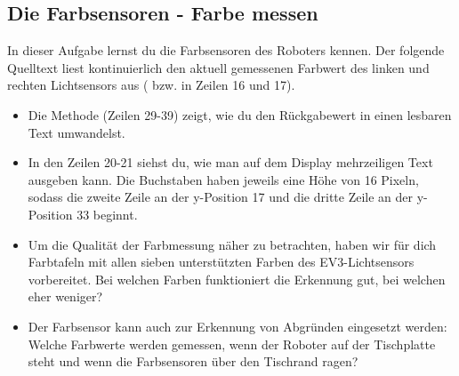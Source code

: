 \subsection{Die Farbsensoren - Farbe messen}
	In dieser Aufgabe lernst du die Farbsensoren des Roboters kennen. Der folgende Quelltext liest kontinuierlich den aktuell gemessenen Farbwert des linken und rechten Lichtsensors aus ( bzw.  in Zeilen 16 und 17).
	\\
	
	
	
	\begin{itemize}
	\item Die Methode  (Zeilen 29-39) zeigt, wie du den Rückgabewert in einen lesbaren Text umwandelst.
	\item In den Zeilen 20-21 siehst du, wie man auf dem Display mehrzeiligen Text ausgeben kann. Die Buchstaben haben jeweils eine Höhe von 16 Pixeln, sodass die zweite Zeile an der y-Position 17 und die dritte Zeile an der y-Position 33 beginnt.
	\item Um die Qualität der Farbmessung näher zu betrachten, haben wir für dich Farbtafeln mit allen sieben unterstützten Farben des EV3-Lichtsensors vorbereitet. Bei welchen Farben funktioniert die Erkennung gut, bei welchen eher weniger?
	\item Der Farbsensor kann auch zur Erkennung von Abgründen eingesetzt werden: Welche Farbwerte werden gemessen, wenn der Roboter auf der Tischplatte steht und wenn die Farbsensoren über den Tischrand ragen?
	\end{itemize}